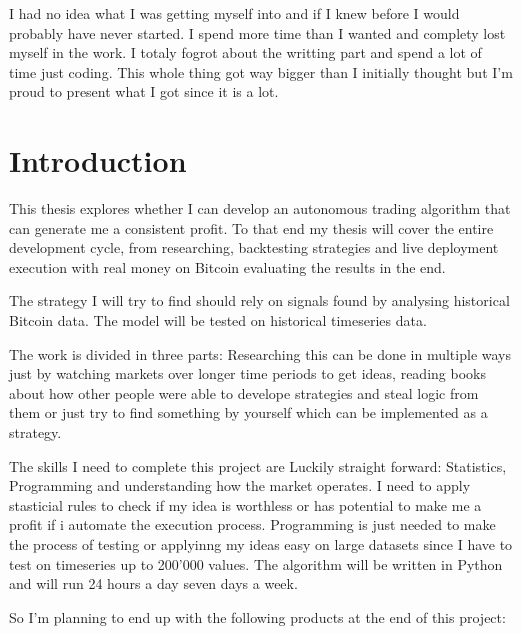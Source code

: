 \documentclass[12pt]{article}
\begin{document}
I had no idea what I was getting myself into and if I knew before I would probably have never started. I spend more time than I wanted and complety lost myself in the work. I totaly fogrot about the writting part and spend a lot of time just coding. This whole thing got way bigger than I initially thought but I'm proud to present what I got since it is a lot.





\clearpage

\tableofcontents
\clearpage

\setcounter{page}{1}
\section{Introduction}
This thesis explores whether I can develop an autonomous trading algorithm that can generate me a consistent profit. To that end my thesis will cover the entire development cycle, from researching, backtesting strategies and live deployment execution with real money on Bitcoin evaluating the results in the end.


The strategy I will try to find should rely on  signals found by analysing historical Bitcoin data. The model will be tested on historical timeseries data.

The work is divided in three parts: Researching this can be done in multiple ways just by watching markets over longer time periods to get ideas, reading books about how other people were able to develope strategies and steal logic from them or just try to find something by yourself which can be implemented as a strategy.



The skills I need to complete this project are Luckily straight forward: Statistics, Programming and understanding how the market operates. I need to apply stasticial rules to check if my idea is worthless or has potential to make me a profit if i automate the execution process. Programming is just needed to make the process of testing or applyinng my ideas easy on large datasets since I have to test on timeseries up to 200'000 values. The algorithm will be written in Python and will run 24 hours a day seven days a week.





So I'm planning to end up with the following products at the end of this project:
\end{document}
